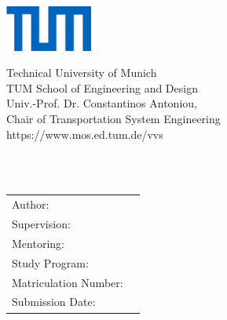 \begin{titlepage}
\begin{flushright}
    \includegraphics[height=15mm]{DefaultTemplate/Logos/TUM1.jpg}
\end{flushright}
    
\vspace{-23mm}
\begin{flushleft}
    \footnotesize{%
    Technical University of Munich\\
    TUM School of Engineering and Design\\
    Univ.-Prof. Dr. Constantinos Antoniou, \\
    Chair of Transportation System Engineering\\
    https://www.mos.ed.tum.de/vvs
    }
\end{flushleft}
\vspace{10mm}

\begin{flushleft}
  \vspace{30mm}
  {\huge\bfseries\getTitle{}}\\  
   \vspace{10mm}
   {\Large\bfseries\getsubTitle{}}\\  
  
\vspace{80mm}%

\begin{tabular}{l l}%
Author:                     &\getAuthor{} \\
Supervision:                &\getSupervisor{} \\
Mentoring:                  &\getMentor{}\\
Study Program:              &\getCourseofStudy{} \\
Matriculation Number:       &\getAuthorMatrNr{}\\
Submission Date:            &\getSubmissionDate{} \\
\end{tabular}
\end{flushleft}

\end{titlepage}